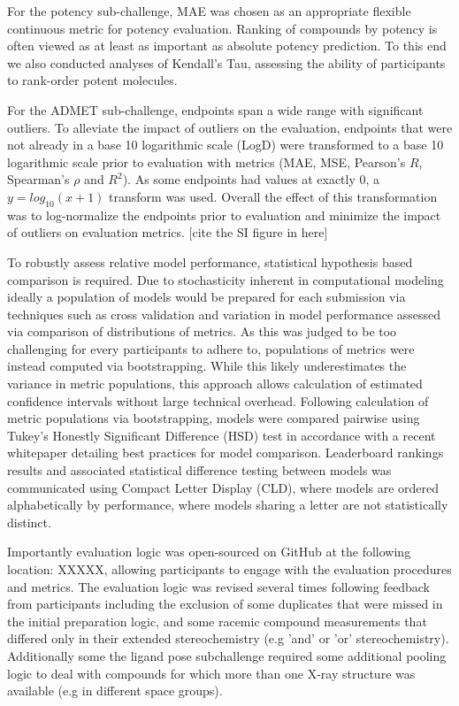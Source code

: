 \documentclass[journal=jcim,manuscript=article]{achemso}
\begin{document}
For the potency sub-challenge, MAE was chosen as an appropriate flexible continuous metric for potency evaluation. Ranking of compounds by potency is often viewed as at least as important as absolute potency prediction. To this end we also conducted analyses of Kendall's Tau, assessing the ability of participants to rank-order potent molecules. 

For the ADMET sub-challenge, endpoints span a wide range with significant outliers. To alleviate the impact of outliers on the evaluation, endpoints that were not already in a base 10 logarithmic scale (LogD) were transformed to a base 10 logarithmic scale prior to evaluation with metrics (MAE, MSE, Pearson's $R$, Spearman's $\rho$ and $R^2$). As some endpoints had values at exactly 0, a $ y=log_{10}(x + 1)$ transform was used. Overall the effect of this transformation was to log-normalize the endpoints prior to evaluation and minimize the impact of outliers on evaluation metrics.  [cite the SI figure in here]

To robustly assess relative model performance, statistical hypothesis based comparison is required. Due to stochasticity inherent in computational modeling ideally a population of models would be prepared for each submission via techniques such as cross validation and variation in model performance assessed via comparison of distributions of metrics. As this was judged to be too challenging for every participants to adhere to, populations of metrics were instead computed via bootstrapping. While this likely underestimates the variance in metric populations, this approach allows calculation of estimated confidence intervals without large technical overhead. Following calculation of metric populations via bootstrapping, models were compared pairwise using Tukey's Honestly Significant Difference (HSD) test in accordance with a recent whitepaper detailing best practices for model comparison. Leaderboard rankings results and associated statistical difference testing between models was communicated using Compact Letter Display (CLD), where models are ordered alphabetically by performance, where models sharing a letter are not statistically distinct. 


Importantly evaluation logic was open-sourced on GitHub at the following location: XXXXX, allowing participants to engage with the evaluation procedures and metrics. The evaluation logic was revised several times following feedback from participants including the exclusion of some duplicates that were missed in the initial preparation logic, and some racemic compound measurements that differed only in their extended stereochemistry (e.g 'and' or 'or' stereochemistry). Additionally some the ligand pose subchallenge required some additional pooling logic to deal with compounds for which more than one X-ray structure was available (e.g in different space groups). 
\end{document}
